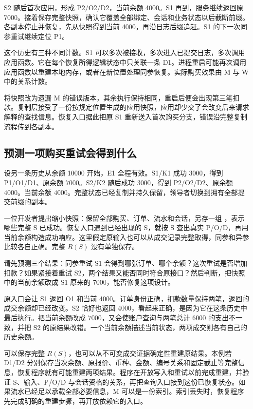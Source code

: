 S2 随后首次应用，形成 P2/O2/D2，当前余额 4000。S1 再到，服务继续返回原 7000。接着保存完整快照，确认它覆盖全部绑定、会话和业务状态以后截断前缀。各副本停止并恢复，先从快照得到当前 4000，再沿日志后缀追赶。S1 的下一次同参重试继续定位 P1。


这个历史有三种不同计数。S1 可以多次被接收，多次进入已提交日志，多次调用应用函数。它在每个恢复所得逻辑状态中只关联一条 D1。进程重启可能再次调用应用函数以重建本地内存，或者在新位置处理同参恢复。实际购买效果由 M 与 W 中的关系计数。

将快照改为遗漏 M 的错误版本，其余执行保持相同，重启后便会出现第三笔扣款。复制层接受了一份按规定位置生成的应用快照，应用却少交了会改变后来请求解释的查找信息。恢复入口据此把原 S1 重新送入首次购买分支，错误沿完整复制流程传到各副本。

\subsection*{预测一项购买重试会得到什么}

设另一条历史从余额 10000 开始，E1 全程有效。S1/K1 成功 3000，得到 P1/O1/D1、原余额 7000。S2/K2 随后成功 3000，得到 P2/O2/D2、原余额 4000。当前余额 4000。完整状态已经复制并持久保留，领导者切换到拥有全部提交前缀的副本。

一位开发者提出缩小快照：保留全部购买、订单、流水和会话，另存一组 ，表示哪些完整 S 已成功。恢复入口遇到已经出现的 S，就按 S 查出真实 P/O/D，再用当前余额构造成功响应。这里假定原输入也可以从成交记录完整取得，同参和异参比较各自正确。完整 $R(S)$ 没有单独保存。

请先预测三个结果：同参重试 S1 会得到哪张订单、哪个余额？这次重试是否增加扣款？如果紧接着重试 S2，两个结果又能否同时符合原接口？然后判断，把快照中的当前余额改成 S1 原来的 7000，能否修复这项设计。

原入口会让 S1 返回 O1 和当前 4000。订单身份正确，扣款数量保持两笔，返回的成交余额却已经改变。S2 恰好也返回 4000，看起来正确，是因为它在这条历史中最后执行。把当前余额改成 7000，又会使账户查询与两笔总计 6000 的支出不一致，并把 S2 的原结果改错。一个当前余额描述当前状态，两项成交则各有自己的历史余额。


可以保存完整 $R(S)$，也可以从不可变成交证据确定性重建原结果。本例若 D1/D2 分别保存当次余额、原报价、币种、金额、编号关系和固定截止等完整信息，恢复程序就有可能重建两项结果。程序在开放写入和重试以前完成重建，并验证 S、输入、P/O/D 与会话资格的关系，再把查询入口接到这份已恢复状态。如果流水已经足以承载全部必要信息，M 可以是一份索引。索引丢失时，恢复程序先完成明确的重建步骤，再开放依赖它的入口。

